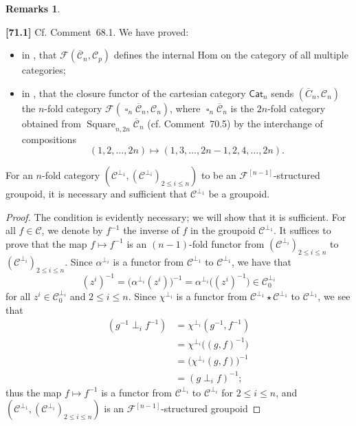 \documentclass[a4paper,fleqn]{article}
\theoremstyle{plain}
\newenvironment{proposition}[1]
  {\renewcommand\theinnerproposition{#1}\innerproposition}
  {\endinnerproposition}
\theoremstyle{definition}
\newtheorem*{remarks}{Remarks}
\newenvironment{longcomm}[1]
  {\noindent\textbf{[#1]}\rmfamily}
  {}
\renewcommand{\leq}{\leqslant}
\newcommand{\CC}{\mathcal{C}}
\newcommand{\FF}{\mathcal{F}}
\DeclareMathOperator{\sq}{\square}
\begin{document}
\begin{remarks}
\begin{enumerate}
      \begin{longcomm}{71.1}
        Cf. Comment~68.1.
        We have proved:
        \begin{itemize}
          \item in \cite{coll119}, that $\FF(\overline{\CC}_n,\CC_p)$ defines the internal Hom on the category of all multiple categories;
          \item in \cite{coll120}, that the closure functor of the cartesian category $\mathsf{Cat}_n$ sends $(\overline{C}_n,\CC_n)$ the $n$-fold category $\FF(\sq_n\overline{\CC}_n,\CC_n)$, where $\sq_n\overline{\CC}_n$ is the $2n$-fold category obtained from $\operatorname{Square}_{n,2n}\overline{\CC}_n$ (cf. Comment~70.5) by the interchange of compositions
          \[
            (1,2,\ldots,2n)
            \longmapsto (1,3,\ldots,2n-1,2,4,\ldots,2n).
          \]
        \end{itemize}
      \end{longcomm}
  \end{enumerate}
\end{remarks}

\begin{proposition}{15}
\label{proposition:ii-15}
  For an $n$-fold category $(\CC^{\perp_1},(\CC^{\perp_i})_{2\leq i\leq n})$ to be an $\FF^{[n-1]}$-structured groupoid, it is necessary and sufficient that $\CC^{\perp_1}$ be a groupoid.
\end{proposition}

\begin{proof}
  The condition is evidently necessary; we will show that it is sufficient.
  For all $f\in\CC$, we denote by $f^{-1}$ the inverse of $f$ in the groupoid $\CC^{\perp_1}$.
  It suffices to prove that the map $f\mapsto f^{-1}$ is an $(n-1)$-fold functor from $(\CC^{\perp_i})_{2\leq i\leq n}$ to $(\CC^{\perp_i})_{2\leq i\leq n}$.
  Since $\alpha^{\perp_i}$ is a functor from $\CC^{\perp_1}$ to $\CC^{\perp_1}$, we have that
  \[
    (z^i)^{-1}
    = \big(\alpha^{\perp_i}(z^i)\big)^{-1}
    = \alpha^{\perp_i}\big((z^i)^{-1}\big)
    \in\CC_0^{\perp_i}
  \]
  for all $z^i\in\CC_0^{\perp_i}$ and $2\leq i\leq n$.
  Since $\chi^{\perp_i}$ is a functor from $\CC^{\perp_1}\star\CC^{\perp_1}$ to $\CC^{\perp_1}$, we see that
  \[
    \begin{aligned}
      (g^{-1}\perp_i f^{-1})
      &= \chi^{\perp_i}(g^{-1},f^{-1})
    \\&= \chi^{\perp_i}\big((g,f)^{-1}\big)
    \\&= \big(\chi^{\perp_i}(g,f)\big)^{-1}
    \\&= (g\perp_i f)^{-1};
    \end{aligned}
  \]
  thus the map $f\mapsto f^{-1}$ is a functor from $\CC^{\perp_i}$ to $\CC^{\perp_i}$ for $2\leq i\leq n$, and $(\CC^{\perp_1},(\CC^{\perp_i})_{2\leq i\leq n})$ is an $\FF^{[n-1]}$-structured groupoid
\end{proof}
\end{document}
